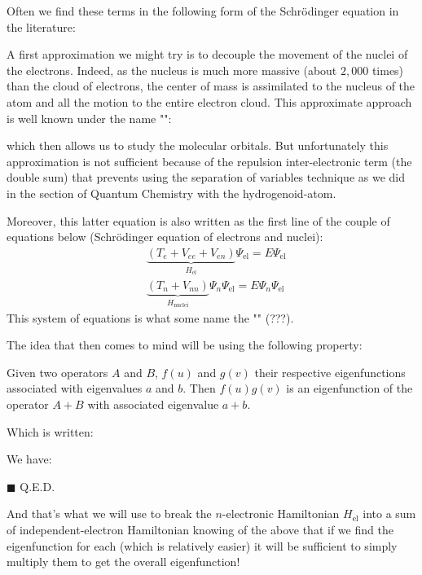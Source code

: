 	Often we find these terms in the following form of the Schrödinger equation in the literature:
	
	A first approximation we might try is to decouple the movement of the nuclei of the electrons. Indeed, as the nucleus is much more massive (about $2,000$ times) than the cloud of electrons, the center of mass is assimilated to the nucleus of the atom and all the motion to the entire electron cloud. This approximate approach is well known under the name "":
	
	which then allows us to study the molecular orbitals. But unfortunately this approximation is not sufficient because of the repulsion inter-electronic term (the double sum) that prevents using the separation of variables technique as we did in the section of Quantum Chemistry with the hydrogenoid-atom.
	
	Moreover, this latter equation is also written as the first line of the couple of equations below (Schrödinger equation of electrons and nuclei):
	\begin{subequations}
		\begin{align}
		&\underbrace{(T_e+V_{ee}+V_{en})}_{H_{\text{el}}}\Psi_{\text{el}}=E\Psi_{\text{el}}\\
		&\underbrace{(T_n+V_{nn})}_{H_{\text{nuclei}}}\Psi_n\Psi_{\text{el}}=E\Psi_n\Psi_{\text{el}}
		\end{align}
	\end{subequations}
	This system of equations is what some name the "" (???).
	
	The idea that then comes to mind will be using the following property:
	
	Given two operators $A$ and $B$, $f (u)$ and $g(v)$ their respective eigenfunctions associated with eigenvalues $a$ and $b$. Then $f (u) g (v)$ is an eigenfunction of the operator $A + B$ with associated eigenvalue $a + b$.

	Which is written:
	
			
	\begin{dem}
		We have:
		
		\begin{flushright}
			$\blacksquare$  Q.E.D.
		\end{flushright}
	\end{dem}
	And that's what we will use to break the $n$-electronic Hamiltonian $H_{\text{el}}$ into a sum of independent-electron Hamiltonian knowing of the above that if we find the eigenfunction for each (which is relatively easier) it will be sufficient to simply multiply them to get the overall eigenfunction!


